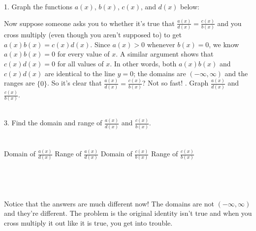 \documentclass[12pt]{article}
\begin{document}
1. Graph the functions $a(x)$, $b(x)$, $c(x)$, and $d(x)$ below:


\vspace{.4in}


Now suppose someone asks you to whether it's true that $\frac{a(x)}{d(x)}= \frac{c(x)}{b(x)}$ and you 
cross multiply (even though you aren't supposed to) to get $a(x)b(x)=c(x)d(x)$. Since $a(x)>0$ 
whenever $b(x)=0$, we know $a(x)b(x)=0$ for 
every value of $x$. A similar argument shows that $c(x)d(x)=0$ for all values of $x$. In other words, 
both $a(x)b(x)$ and $c(x)d(x)$ are identical to the line $y=0$; the domains are $(-\infty, \infty)$ and
the ranges are $\{0\}$. So it's clear that $\frac{a(x)}{d(x)}= \frac{c(x)}{b(x)}$? Not so fast!
. Graph $\frac{a(x)}{d(x)}$ and $\frac{c(x)}{b(x)}$.\\\\

\vspace{.4in}


3. Find the domain and range of $\frac{a(x)}{d(x)}$ and $\frac{c(x)}{b(x)}$.\\\\\\
Domain of $\frac{a(x)}{d(x)}$ \hspace{.75in} Range of $\frac{a(x)}{d(x)}$ \hspace{1in} 
Domain of $\frac{c(x)}{b(x)}$ \hspace{.75in} Range of $\frac{c(x)}{b(x)}$\\\\\\\\\\

Notice that the answers are much different now!  The domains are not $(-\infty, \infty)$ and they're
different. The problem is the original identity isn't true and when you cross multiply it out like it
is true, you get into trouble.
\end{document}
